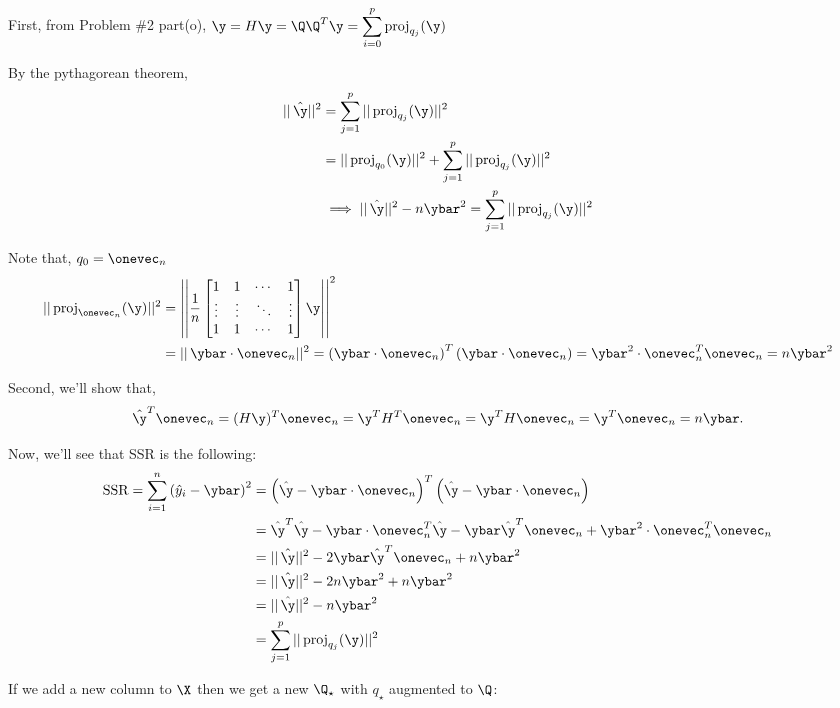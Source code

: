 \documentclass[12pt]{article}
\begin{document}
\begin{enumerate}
\begin{tcolorbox}[colback = white, sharp corners]
First, from Problem \#2 part(o), 
$\displaystyle \y = H \y = \Q \Q^T \y = \sum_{i=0}^p \text{proj}_{q_j}(\y)$

By the pythagorean theorem, 
\begin{align*}
||\, \hat{\y} ||^2 &= \sum_{j=1}^p ||\, \text{proj}_{q_j}(\y) ||^2 \\
&= ||\, \text{proj}_{q_0}(\y) ||^2 + \sum_{j=1}^p ||\, \text{proj}_{q_j}(\y) ||^2 \\
&\implies ||\, \hat{\y} ||^2 - n \ybar^2 = \sum_{j=1}^p ||\, \text{proj}_{q_j}(\y) ||^2
\end{align*}

Note that, $q_0 = \onevec_n$
\begin{align*}
||\, \text{proj}_{\onevec_n}(\y) ||^2 &= \left|\left| \dfrac{1}{n}  \begin{bmatrix}
1 & 1 & \cdots & 1 \\
\vdots & \vdots & \ddots & \vdots \\
1 & 1 & \cdots & 1
\end{bmatrix} \y \right|\right|^2 \\
&= ||\, \ybar \cdot \onevec_n ||^2 = \left( \ybar \cdot \onevec_n \right)^T \left( \ybar \cdot \onevec_n \right) = \ybar^2 \cdot \onevec_n^T \onevec_n = n \ybar^2
\end{align*}


Second, we'll show that,
\[
	\hat{\y}^T \onevec_n = (H\y)^T \onevec_n = \y^T H^T \onevec_n = \y^T H \onevec_n = \y^T \onevec_n = n \ybar.
\]

Now, we'll see that SSR is the following:
\begin{align*}
\text{SSR} = \sum_{i = 1}^n \left( \hat{y}_i - \ybar \right)^2 &= \left( \hat{\y} - \ybar \cdot \onevec_n \right)^T\left( \hat{\y} - \ybar \cdot \onevec_n  \right) \\
&= \hat{\y}^T \hat{\y} - \ybar \cdot \onevec_n^T \hat{\y} - \ybar \hat{\y}^T \onevec_n + \ybar^2 \cdot \onevec_n^T \onevec_n \\
&= ||\, \hat{\y} ||^2 - 2 \ybar \hat{\y}^T \onevec_n + n \ybar^2 \\
&= ||\, \hat{\y} ||^2 - 2 n \ybar^2 + n \ybar^2\\
&= ||\, \hat{\y} ||^2 - n\ybar^2 \\
&= \sum_{j=1}^p ||\, \text{proj}_{q_j}(\y) ||^2
\end{align*}

If we add a new column to $\X$ then we get a new $\Q_{\star}$ with $q_{\star}$ augmented to $\Q$:


\end{tcolorbox}
\end{enumerate}
\end{document}
